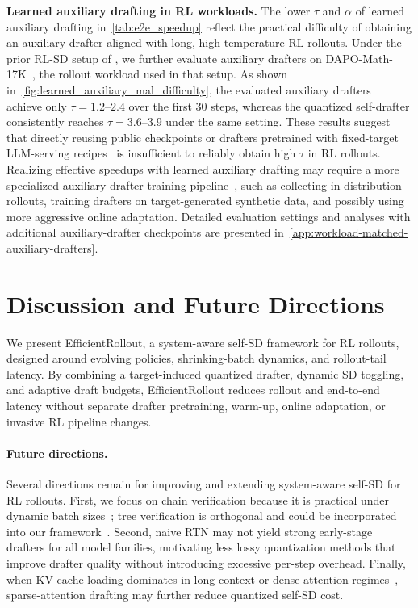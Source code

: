\documentclass{llmxive}
\providecommand{\methodtitle}{EfficientRollout}
\providecommand{\learned}{learned auxiliary drafting}
\providecommand{\mal}{\tau}
\begin{document}
\textbf{Learned auxiliary drafting in RL workloads.}
The lower $\mal$ and $\alpha$ of \learned{} in~\cref{tab:e2e_speedup} reflect the practical difficulty of obtaining an auxiliary drafter aligned with long, high-temperature RL rollouts.
Under the prior RL-SD setup of \citet{iso2026accelerating}, we further evaluate auxiliary drafters on DAPO-Math-17K~\citep{yu2025dapo}, the rollout workload used in that setup.
As shown in~\cref{fig:learned_auxiliary_mal_difficulty}, the evaluated auxiliary drafters~\citep{redhatai2025llama31eagle3,redhatai2025qwen3eagle3thinking} achieve only $\mal=1.2$--$2.4$ over the first 30 steps, whereas the quantized self-drafter consistently reaches $\mal=3.6$--$3.9$ under the same setting.
These results suggest that directly reusing public checkpoints or drafters pretrained with fixed-target LLM-serving recipes~\citep{li2025eagle,zhang2025fastgrpo} is insufficient to reliably obtain high $\mal$ in RL rollouts.
Realizing effective speedups with \learned{} may require a more specialized auxiliary-drafter training pipeline~\citep{zhou2024distillspec, iso2026accelerating}, such as collecting in-distribution rollouts, training drafters on target-generated synthetic data, and possibly using more aggressive online adaptation.
Detailed evaluation settings and analyses with additional auxiliary-drafter checkpoints are presented in~\cref{app:workload-matched-auxiliary-drafters}.

\section{Discussion and Future Directions}
\label{sec:discussion_future}

We present \methodtitle{}, a system-aware self-SD framework for RL rollouts, designed around evolving policies, shrinking-batch dynamics, and rollout-tail latency.
By combining a target-induced quantized drafter, dynamic SD toggling, and adaptive draft budgets, \methodtitle{} reduces rollout and end-to-end latency without separate drafter pretraining, warm-up, online adaptation, or invasive RL pipeline changes.

\paragraph{Future directions.}

Several directions remain for improving and extending system-aware self-SD for RL rollouts.
First, we focus on chain verification because it is practical under dynamic batch sizes~\citep{liu2025speculative}; tree verification is orthogonal and could be incorporated into our framework~\citep{li2024eagle,li2025eagle}.
Second, naive RTN may not yield strong early-stage drafters for all model families, motivating less lossy quantization methods that improve drafter quality without introducing excessive per-step overhead.
Finally, when KV-cache loading dominates in long-context or dense-attention regimes~\citep{cordonnier2020multi}, sparse-attention drafting may further reduce quantized self-SD cost.
\end{document}
